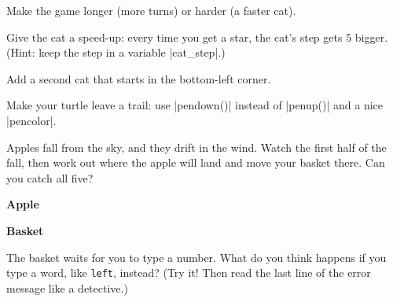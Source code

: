 \begin{challenge}[Level up]
\tick Make the game longer (more turns) or harder (a faster cat).\par
\tick Give the cat a speed-up: every time you get a star, the cat's step gets 5 bigger. (Hint: keep the step in a variable \py|cat_step|.)\par
\tick Add a second cat that starts in the bottom-left corner.\par
\tick Make your turtle leave a trail: use \py|pendown()| instead of \py|penup()| and a nice \py|pencolor|.
\end{challenge}


Apples fall from the sky, and they drift in the wind. Watch the first half of the fall, then work out where the apple will land and move your basket there. Can you catch all five?

\begin{center}
\begin{minipage}[t]{0.6\linewidth}
\textbf{Apple}\par
\begin{scratch}[scale=0.9]
\end{scratch}
\end{minipage}\hfill
\begin{minipage}[t]{0.37\linewidth}
\textbf{Basket}\par
\begin{scratch}[scale=0.9]
\end{scratch}
\end{minipage}
\end{center}

\begin{think}
The basket waits for you to type a number. What do you think happens if you type a word, like \texttt{left}, instead? (Try it! Then read the last line of the error message like a detective.)
\end{think}

